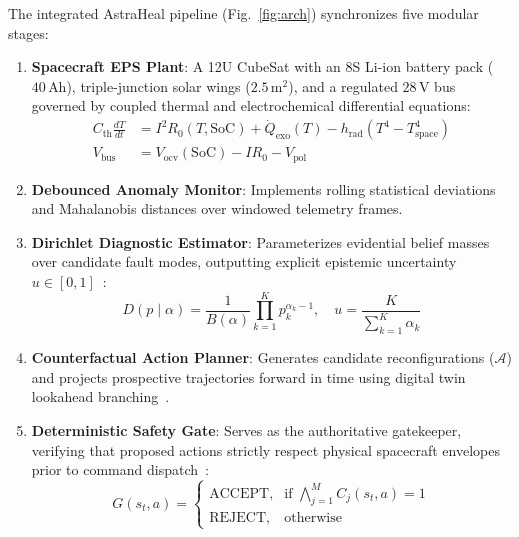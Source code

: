 \documentclass[conference]{IEEEtran}
\begin{document}
The integrated AstraHeal pipeline (Fig.~\ref{fig:arch}) synchronizes five modular stages:
\begin{enumerate}
    \item \textbf{Spacecraft EPS Plant}: A 12U CubeSat with an 8S Li-ion battery pack ($40\,\text{Ah}$), triple-junction solar wings ($2.5\,\text{m}^2$), and a regulated $28\,\text{V}$ bus governed by coupled thermal and electrochemical differential equations:
    \begin{align}
    C_{\text{th}} \frac{dT}{dt} &= I^2 R_0(T, \text{SoC}) + \dot{Q}_{\text{exo}}(T) - h_{\text{rad}} (T^4 - T_{\text{space}}^4) \\
    V_{\text{bus}} &= V_{\text{ocv}}(\text{SoC}) - I R_0 - V_{\text{pol}}
    \end{align}
    \item \textbf{Debounced Anomaly Monitor}: Implements rolling statistical deviations and Mahalanobis distances over windowed telemetry frames.
    \item \textbf{Dirichlet Diagnostic Estimator}: Parameterizes evidential belief masses over candidate fault modes, outputting explicit epistemic uncertainty $u \in [0, 1]$~\cite{sensoy2018evidential}:
    \begin{equation}
    D(p \mid \alpha) = \frac{1}{B(\alpha)} \prod_{k=1}^K p_k^{\alpha_k - 1}, \quad u = \frac{K}{\sum_{k=1}^K \alpha_k}
    \end{equation}
    \item \textbf{Counterfactual Action Planner}: Generates candidate reconfigurations ($\mathcal{A}$) and projects prospective trajectories forward in time using digital twin lookahead branching~\cite{thambisetty2026astraheal}.
    \item \textbf{Deterministic Safety Gate}: Serves as the authoritative gatekeeper, verifying that proposed actions strictly respect physical spacecraft envelopes prior to command dispatch~\cite{astraheal2026paper3}:
    \begin{equation}
    G(s_t, a) = 
    \begin{cases}
    \text{ACCEPT}, & \text{if } \bigwedge_{j=1}^M C_j(s_t, a) = 1 \\
    \text{REJECT}, & \text{otherwise}
    \end{cases}
    \end{equation}
\end{enumerate}
\end{document}
